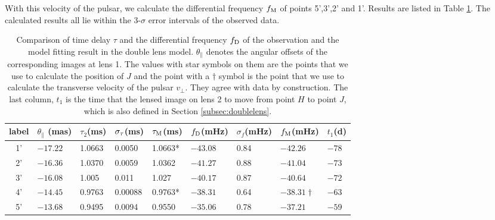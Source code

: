 \documentclass[useAMS,usenatbib]{mn2e}
\begin{document}


With this velocity of the pulsar, we calculate the differential frequency $f_{\rm M}$ of points 5',3',2' and 1'. Results are listed in Table \ref{table:double_lens_compare}. The calculated results all lie within the 3-$\sigma$ error intervals of the observed data. 



\begin{table}
\centering
\begin{tabular}{c|llllllll}
\hline
label&$\theta_{\parallel}$ (mas)  & $\tau_2$(ms) & $\sigma_{\rm \tau}$(ms)  & $\tau_{\rm M}$(ms) & $f_{\rm D}$(mHz)  &$\sigma_{f}$(mHz)      &  $f_{\rm M}$(mHz)& $t_1$(d) \\ \hline
1'& $-17.22$  &  1.0663     &0.0050    & 1.0663*        & $-43.08$    &0.84   & $-42.26$           & $-78$\\
 2'& $-16.36$  &    1.0370     &0.0059    & 1.0362       & $-41.27$    & 0.88   & $-41.04$          & $-73$\\ 
3'& $-16.08$  &   1.005    &0.011   & 1.027          & $-40.17$    &   0.87     & $-40.64$          & $-72$\\ 
 4'& $-14.45$  &   0.9763    &0.00088   & 0.9763*       & $-38.31$     &0.64    & $-38.31\dagger$  & $-63$\\ 
5'& $-13.68$  &    0.9495     &0.0094    & 0.9550       & $-35.06$     &0.78    & $-37.21$          &$-59$\\ 
 \hline
\end{tabular}
\caption{Comparison of time delay $\tau$ and the differential
  frequency $f_{\rm D}$ of the observation and the model fitting result in the
  double lens model. $\theta_{\parallel}$ denotes the angular offsets
  of the corresponding images at lens 1. 
The values with star symbols on them are the points that we use to
calculate the position of $J$ and the point with a $\dagger$ symbol is
the point that we use to calculate the transverse velocity of the pulsar $v_{\bot}$.  They agree with data by construction. The last column, $t_1$ is the time that the lensed image on lens 2 to move from point $H$ to point $J$, which is also defined in Section \ref{subsec:doublelens}.}
\label{table:double_lens_compare}
\end{table}
\end{document}
